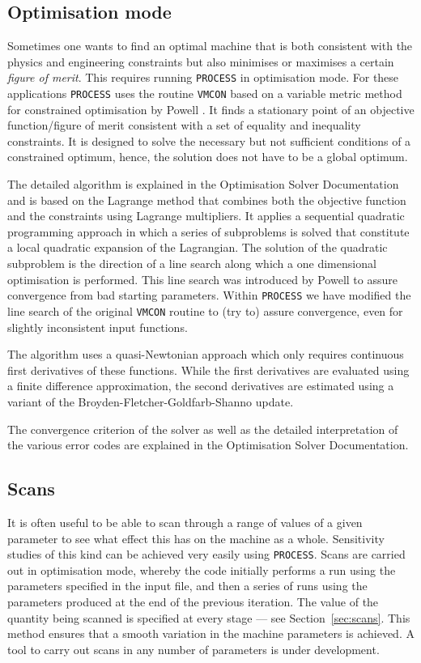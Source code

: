 \documentclass[11pt,a4paper]{report}
\newcommand{\process}{\mbox{\texttt{PROCESS}}}
\newcommand{\vmcon}{\mbox{\texttt{VMCON}}}
\begin{document}
\subsection{Optimisation mode}


Sometimes one wants to find an optimal machine that is both consistent with
the physics and engineering constraints but also minimises or maximises a
certain \textit{figure of merit}. This requires running \process\/ in
optimisation mode. For these applications \process\/ uses the routine \vmcon\/
\cite{vmcon} based on a variable metric method for constrained optimisation by
Powell \cite{Powell1978}. It finds a stationary point of an objective
function/figure of merit consistent with a set of equality and inequality
constraints. It is designed to solve the
necessary but not sufficient conditions of a constrained optimum, hence, the
solution does not have to be a global optimum.

The detailed algorithm is explained in the Optimisation Solver Documentation and is based on
the Lagrange method that combines both the
objective function and the constraints using Lagrange multipliers. It applies
a sequential quadratic programming approach in which a
series of subproblems is solved that constitute a local quadratic expansion of
the Lagrangian. The solution of the quadratic
subproblem is the direction of a line search along which a one dimensional
optimisation is performed. This line search was
introduced by Powell to assure convergence from bad starting parameters.
Within \process\/ we have modified the line search of the original \vmcon\/
routine to (try to) assure convergence, even for slightly inconsistent input
functions.

The algorithm uses a quasi-Newtonian approach which only requires continuous
first derivatives of these functions. While the first derivatives are
evaluated using a finite difference approximation, the second derivatives are
estimated using a variant of the Broyden-Fletcher-Goldfarb-Shanno update.

The convergence criterion of the solver as well as the detailed interpretation
of the various error codes are explained in the Optimisation Solver Documentation. 


\subsection{Scans}

It is often useful to be able to scan through a range of values of a given
parameter to see what effect this has on the machine as a whole.  Sensitivity
studies of this kind can be achieved very easily using \process. Scans are
carried out in optimisation mode, whereby the code initially performs a run
using the parameters specified in the input file, and then a series of runs
using the parameters produced at the end of the previous iteration. The value
of the quantity being scanned is specified at every stage --- see
Section~\ref{sec:scans}. This method ensures that a smooth variation in the
machine parameters is achieved.  A tool to carry out scans in any number of parameters is under development.
\end{document}
